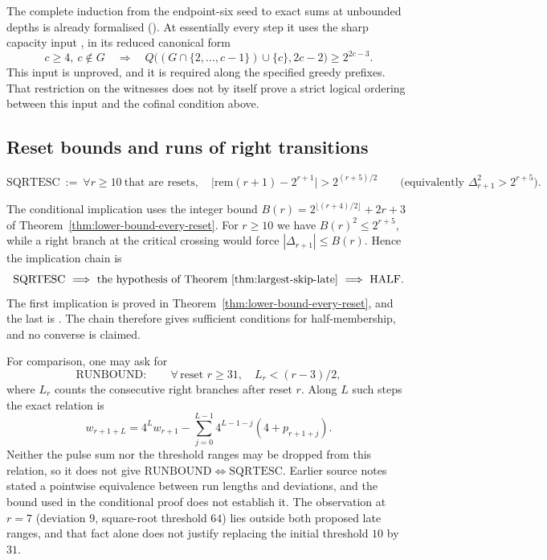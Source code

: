 The complete induction from the endpoint-six seed to exact sums at unbounded depths is already
formalised
().
At essentially every step it uses the sharp capacity input
,
in its reduced canonical form
\[
 c\ge4,\ c\notin G\quad\Longrightarrow\quad
 Q\bigl((G\cap\{2,\ldots,c-1\})\cup\{c\},2c-2\bigr)
 \ge2^{2c-3}.
\]
This input is unproved, and it is required along the specified greedy prefixes.  That
restriction on the witnesses does not by itself prove a strict logical
ordering between this input and the cofinal condition above.

\subsection{Reset bounds and runs of right transitions}
\label{sec:o4}

\begin{defn}
\[
\mathrm{SQRTESC}\ :=\ \forall r\ge10\ \text{that are resets},\quad
\big|\mathrm{rem}(r+1)-2^{r+1}\big|>2^{(r+5)/2}
\qquad\Big(\text{equivalently } \Delta_{r+1}^2 > 2^{r+5}\Big).
\]
\end{defn}
The conditional implication uses the integer bound
$B(r)=2^{\lfloor(r+4)/2\rfloor}+2r+3$ of Theorem~\ref{thm:lower-bound-every-reset}.
For $r\ge10$ we have $B(r)^2\le2^{r+5}$, while a right branch at the
critical crossing would force $|\Delta_{r+1}|\le B(r)$.
Hence the implication chain is
\[
 \mathrm{SQRTESC}\ \Longrightarrow\
 \text{the hypothesis of Theorem~\ref{thm:largest-skip-late}}\ \Longrightarrow\ \mathrm{HALF}.
\]
The first implication is proved in Theorem~\ref{thm:lower-bound-every-reset},
and the last is
.
The chain therefore gives sufficient conditions for half-membership, and
no converse is claimed.

For comparison, one may ask for
\[
 \mathrm{RUNBOUND}:\qquad
 \forall\,\text{reset }r\ge31,\quad L_r<(r-3)/2,
\]
where $L_r$ counts the consecutive right branches after reset $r$.
Along $L$ such steps the exact relation is
\[
 w_{r+1+L}=4^Lw_{r+1}
   -\sum_{j=0}^{L-1}4^{L-1-j}(4+p_{r+1+j}).
\]
Neither the pulse sum nor the threshold ranges may be dropped from this
relation, so it does not give
$\mathrm{RUNBOUND}\Leftrightarrow\mathrm{SQRTESC}$.
Earlier source notes stated a pointwise equivalence between run lengths
and deviations, and the bound used in the conditional proof does not establish it.
The observation at $r=7$ (deviation $9$, square-root threshold $64$)
lies outside both proposed late ranges, and that fact alone does not
justify replacing the initial threshold $10$ by $31$.

